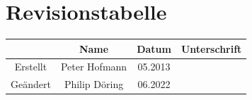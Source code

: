 \documentclass[a5paper,oneside,openany,headings=small]{scrbook}
\begin{document}
\newpage
\thispagestyle{empty}
\section*{Revisionstabelle}

\begin{table}[H]
	\centering
	\begin{tabular}{c|c|c|c}
		& \textbf{Name} & \textbf{Datum} & \textbf{Unterschrift}\\
		\hline
		Erstellt & Peter Hofmann & 05.2013 & \\
		\hline
		Geändert & Philip Döring & 06.2022 & 
	\end{tabular}
\end{table}

\newpage
\thispagestyle{empty}

\newpage
{}
\setlength\parindent{0pt}
\tableofcontents
\newpage
\thispagestyle{empty}





%


%
%


\appendix
\end{document}
